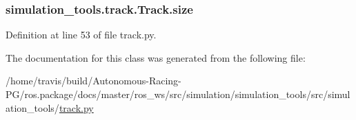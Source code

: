 \subsubsection[{\texorpdfstring{size}{size}}]{\setlength{\rightskip}{0pt plus 5cm}simulation\+\_\+tools.\+track.\+Track.\+size}\hypertarget{classsimulation__tools_1_1track_1_1_track_a69be8807eecacfd98981e206ea3a003f}{}\label{classsimulation__tools_1_1track_1_1_track_a69be8807eecacfd98981e206ea3a003f}


Definition at line 53 of file track.\+py.



The documentation for this class was generated from the following file\+:\begin{DoxyCompactItemize}
\item 
/home/travis/build/\+Autonomous-\/\+Racing-\/\+P\+G/ros.\+package/docs/master/ros\+\_\+ws/src/simulation/simulation\+\_\+tools/src/simulation\+\_\+tools/\hyperlink{track_8py}{track.\+py}\end{DoxyCompactItemize}
